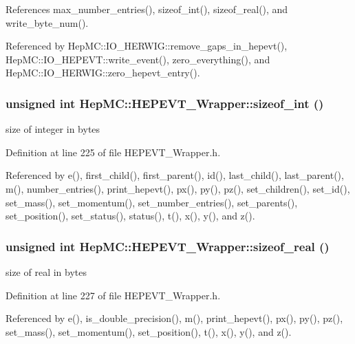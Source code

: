 References max\_\-number\_\-entries(), sizeof\_\-int(), sizeof\_\-real(), and write\_\-byte\_\-num().

Referenced by Hep\-MC::IO\_\-HERWIG::remove\_\-gaps\_\-in\_\-hepevt(), Hep\-MC::IO\_\-HEPEVT::write\_\-event(), zero\_\-everything(), and Hep\-MC::IO\_\-HERWIG::zero\_\-hepevt\_\-entry().
\subsubsection{\setlength{\rightskip}{0pt plus 5cm}unsigned int Hep\-MC::HEPEVT\_\-Wrapper::sizeof\_\-int ()\hspace{0.3cm}{\tt  [inline, static]}}\label{classHepMC_1_1HEPEVT__Wrapper_e18137894d93e86612e4c92fd982dfeb}


size of integer in bytes 



Definition at line 225 of file HEPEVT\_\-Wrapper.h.

Referenced by e(), first\_\-child(), first\_\-parent(), id(), last\_\-child(), last\_\-parent(), m(), number\_\-entries(), print\_\-hepevt(), px(), py(), pz(), set\_\-children(), set\_\-id(), set\_\-mass(), set\_\-momentum(), set\_\-number\_\-entries(), set\_\-parents(), set\_\-position(), set\_\-status(), status(), t(), x(), y(), and z().
\subsubsection{\setlength{\rightskip}{0pt plus 5cm}unsigned int Hep\-MC::HEPEVT\_\-Wrapper::sizeof\_\-real ()\hspace{0.3cm}{\tt  [inline, static]}}\label{classHepMC_1_1HEPEVT__Wrapper_5f88ad0a447c6ff6ab066a0b39db1562}


size of real in bytes 



Definition at line 227 of file HEPEVT\_\-Wrapper.h.

Referenced by e(), is\_\-double\_\-precision(), m(), print\_\-hepevt(), px(), py(), pz(), set\_\-mass(), set\_\-momentum(), set\_\-position(), t(), x(), y(), and z().
